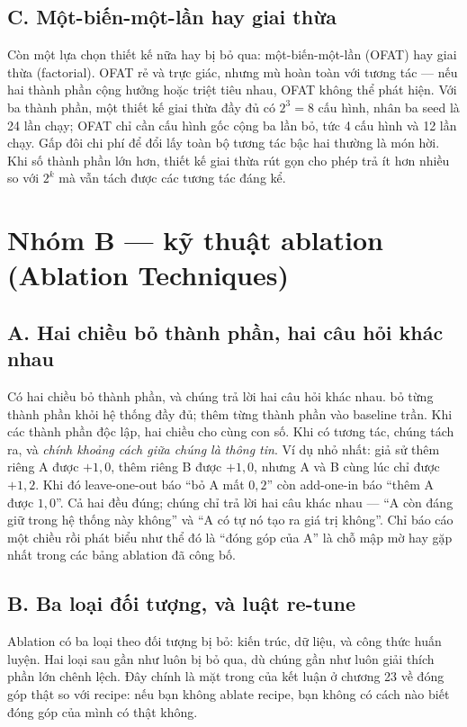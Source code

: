 \documentclass[../../deep_learning.tex]{subfiles}
\begin{document}
\subsection{C. Một-biến-một-lần hay giai thừa}
Còn một lựa chọn thiết kế nữa hay bị bỏ qua: một-biến-một-lần (OFAT) hay giai thừa (factorial). OFAT rẻ và trực giác, nhưng mù hoàn toàn với tương tác — nếu hai thành phần cộng hưởng hoặc triệt tiêu nhau, OFAT không thể phát hiện. Với ba thành phần, một thiết kế giai thừa đầy đủ có \(2^3 = 8\) cấu hình, nhân ba seed là 24 lần chạy; OFAT chỉ cần cấu hình gốc cộng ba lần bỏ, tức 4 cấu hình và 12 lần chạy. Gấp đôi chi phí để đổi lấy toàn bộ tương tác bậc hai thường là món hời. Khi số thành phần lớn hơn, thiết kế giai thừa rút gọn cho phép trả ít hơn nhiều so với \(2^k\) mà vẫn tách được các tương tác đáng kể.

\section{Nhóm B --- kỹ thuật ablation (Ablation Techniques)}
\subsection{A. Hai chiều bỏ thành phần, hai câu hỏi khác nhau}
Có hai chiều bỏ thành phần, và chúng trả lời hai câu hỏi khác nhau.  bỏ từng thành phần khỏi hệ thống đầy đủ;  thêm từng thành phần vào baseline trần. Khi các thành phần độc lập, hai chiều cho cùng con số. Khi có tương tác, chúng tách ra, và \emph{chính khoảng cách giữa chúng là thông tin}. Ví dụ nhỏ nhất: giả sử thêm riêng A được \(+1{,}0\), thêm riêng B được \(+1{,}0\), nhưng A và B cùng lúc chỉ được \(+1{,}2\). Khi đó leave-one-out báo ``bỏ A mất \(0{,}2\)'' còn add-one-in báo ``thêm A được \(1{,}0\)''. Cả hai đều đúng; chúng chỉ trả lời hai câu khác nhau — ``A còn đáng giữ trong hệ thống này không'' và ``A có tự nó tạo ra giá trị không''. Chỉ báo cáo một chiều rồi phát biểu như thể đó là ``đóng góp của A'' là chỗ mập mờ hay gặp nhất trong các bảng ablation đã công bố.

\subsection{B. Ba loại đối tượng, và luật re-tune}
Ablation có ba loại theo đối tượng bị bỏ: kiến trúc, dữ liệu, và công thức huấn luyện. Hai loại sau gần như luôn bị bỏ qua, dù chúng gần như luôn giải thích phần lớn chênh lệch. Đây chính là mặt trong của kết luận ở chương 23 về đóng góp thật so với recipe: nếu bạn không ablate recipe, bạn không có cách nào biết đóng góp của mình có thật không.
\end{document}
